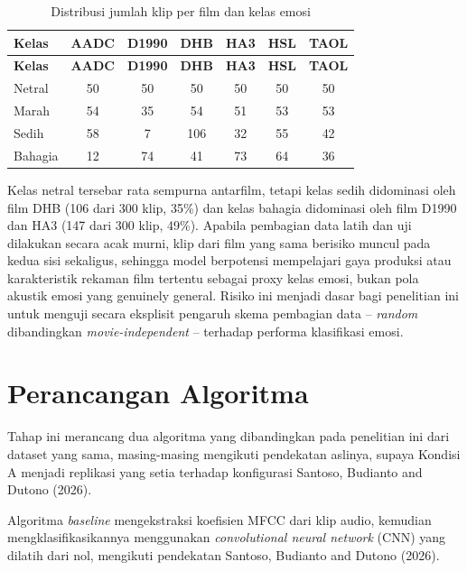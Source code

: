 {\renewcommand{\arraystretch}{1.3}\setlength{\tabcolsep}{11pt}
\begin{longtable}{|l|c|c|c|c|c|c|}
  \caption{Distribusi jumlah klip per film dan kelas emosi}
  \label{tab:3.confound} \\
  \hline
  \textbf{Kelas} & \textbf{AADC} & \textbf{D1990} & \textbf{DHB} & \textbf{HA3} & \textbf{HSL} & \textbf{TAOL} \\
  \hline
  \endfirsthead
  \hline
  \textbf{Kelas} & \textbf{AADC} & \textbf{D1990} & \textbf{DHB} & \textbf{HA3} & \textbf{HSL} & \textbf{TAOL} \\
  \hline
  \endhead
  \hline
  \endfoot
  \hline
  \endlastfoot
  Netral  & 50 & 50 & 50  & 50 & 50 & 50 \\ \hline
  Marah   & 54 & 35 & 54  & 51 & 53 & 53 \\ \hline
  Sedih   & 58 & 7  & 106 & 32 & 55 & 42 \\ \hline
  Bahagia & 12 & 74 & 41  & 73 & 64 & 36 \\
\end{longtable}
}

\noindent
Kelas netral tersebar rata sempurna antarfilm, tetapi kelas sedih
didominasi oleh film DHB (106 dari 300 klip, 35\%) dan kelas bahagia
didominasi oleh film D1990 dan HA3 (147 dari 300 klip, 49\%). Apabila
pembagian data latih dan uji dilakukan secara acak murni, klip dari film
yang sama berisiko muncul pada kedua sisi sekaligus, sehingga model
berpotensi mempelajari gaya produksi atau karakteristik rekaman film
tertentu sebagai proxy kelas emosi, bukan pola akustik emosi yang
genuinely general. Risiko ini menjadi dasar bagi penelitian ini untuk
menguji secara eksplisit pengaruh skema pembagian data -- \emph{random}
dibandingkan \emph{movie-independent} -- terhadap performa klasifikasi
emosi.

\section{Perancangan Algoritma}
\label{sec:3.4}

Tahap ini merancang dua algoritma yang dibandingkan pada penelitian ini
dari dataset yang sama, masing-masing mengikuti pendekatan aslinya,
supaya Kondisi A menjadi replikasi yang setia terhadap konfigurasi
Santoso, Budianto and Dutono (2026).

Algoritma \emph{baseline} mengekstraksi koefisien MFCC dari klip audio,
kemudian mengklasifikasikannya menggunakan \emph{convolutional neural
network} (CNN) yang dilatih dari nol, mengikuti pendekatan Santoso,
Budianto and Dutono (2026).

